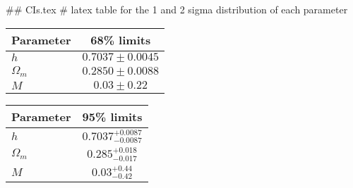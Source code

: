 ## CIs.tex
# latex table for the 1 and 2 sigma distribution of each parameter

\begin{tabular} { l  c}
 Parameter &  68\% limits\\
\hline
{\boldmath$h              $} & $0.7037\pm 0.0045          $\\
{\boldmath$\Omega_m       $} & $0.2850\pm 0.0088          $\\
{\boldmath$M              $} & $0.03\pm 0.22              $\\
\hline
\end{tabular}

\begin{tabular} { l  c}
 Parameter &  95\% limits\\
\hline
{\boldmath$h              $} & $0.7037^{+0.0087}_{-0.0087}$\\
{\boldmath$\Omega_m       $} & $0.285^{+0.018}_{-0.017}   $\\
{\boldmath$M              $} & $0.03^{+0.44}_{-0.42}      $\\
\hline
\end{tabular}
